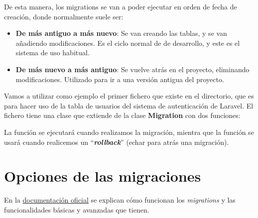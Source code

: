 De esta manera, los migrations se van a poder ejecutar en orden de fecha de creación, donde normalmente suele ser:
\begin{itemize}
    \item \textbf{De más antiguo a más nuevo}: Se van creando las tablas, y se van añadiendo modificaciones. Es el ciclo normal de de desarrollo, y este es el sistema de uso habitual.
    \item \textbf{De más nuevo a más antiguo}: Se vuelve atrás en el proyecto, eliminando modificaciones. Utilizado para ir a una versión antigua del proyecto.
\end{itemize}

Vamos a utilizar como ejemplo el primer fichero que existe en el directorio, que es para hacer uso de la tabla de usuarios del sistema de autenticación de Laravel. El fichero tiene una clase que extiende de la clase \textbf{Migration} con dos funciones:


La función  se ejecutará cuando realizamos la migración, mientra que la función  se usará cuando realicemos un “\textbf{\textit{rollback}}” (echar para atrás una migración).

\section{Opciones de las migraciones}

En la \href{https://laravel.com/docs/10.x/migrations#tables}{documentación oficial} se explican cómo funcionan los \textit{migrations} y las funcionalidades básicas y avanzadas que tienen.

